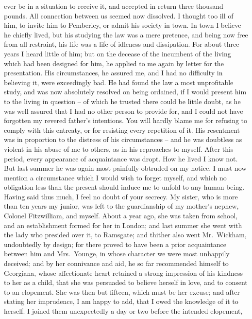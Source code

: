 \begin{letter}
ever be in a situation to receive it, and accepted in return
three thousand pounds. All connection between us
seemed now dissolved. I thought too ill of him, to invite
him to Pemberley, or admit his society in town. In town
I believe he chiefly lived, but his studying the law was
a mere pretence, and being now free from all restraint,
his life was a life of idleness and dissipation. For about
three years I heard little of him; but on the decease
of the incumbent of the living which had been designed
for him, he applied to me again by letter for the presentation.
His circumstances, he assured me, and I had no
difficulty in believing it, were exceedingly bad. He had
found the law a most unprofitable study, and was now
absolutely resolved on being ordained, if I would present
him to the living in question -- of which he trusted there
could be little doubt, as he was well assured that I had
no other person to provide for, and I could not have
forgotten my revered father’s intentions. You will hardly
blame me for refusing to comply with this entreaty, or
for resisting every repetition of it. His resentment was
in proportion to the distress of his circumstances -- and
he was doubtless as violent in his abuse of me to others,
as in his reproaches to myself. After this period, every
appearance of acquaintance was dropt. How he lived
I know not. But last summer he was again most painfully
obtruded on my notice. I must now mention a circumstance
which I would wish to forget myself, and which
no obligation less than the present should induce me to
unfold to any human being. Having said thus much,
I feel no doubt of your secrecy. My sister, who is more
than ten years my junior, was left to the guardianship of
my mother’s nephew, Colonel Fitzwilliam, and myself.
About a year ago, she was taken from school, and an
establishment formed for her in London; and last summer
she went with the lady who presided over it, to Ramsgate;
and thither also went Mr.\ Wickham, undoubtedly by
design; for there proved to have been a prior acquaintance
between him and Mrs.\ Younge, in whose character we
were most unhappily deceived; and by her connivance
and aid, he so far recommended himself to Georgiana,
whose affectionate heart retained a strong impression of
his kindness to her as a child, that she was persuaded to
believe herself in love, and to consent to an elopement.
She was then but fifteen, which must be her excuse; and
after stating her imprudence, I am happy to add, that
I owed the knowledge of it to herself. I joined them
unexpectedly a day or two before the intended elopement,

\end{letter}
